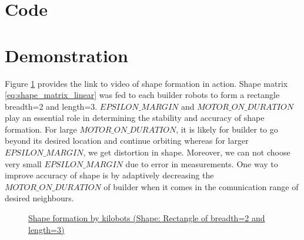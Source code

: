 \documentclass{report}[12pt]
\begin{document}
\section{Code}



\section{Demonstration}
Figure \ref{fig:shape_formation_demo} provides the link to video of shape formation in action. Shape matrix \eqref{eq:shape_matrix_linear} was fed to each builder robots to form a rectangle  breadth=2 and length=3. $EPSILON\_MARGIN$ and $MOTOR\_ON\_DURATION$ play an essential role in determining the stability and accuracy of shape formation. For large $MOTOR\_ON\_DURATION$, it is likely for builder to go beyond its desired location and continue orbiting whereas for larger $EPSILON\_MARGIN$, we get distortion in shape. Moreover, we can not choose very small $EPSILON\_MARGIN$ due to error in measurements. One way to improve accuracy of shape is by adaptively decreasing the $MOTOR\_ON\_DURATION$ of builder when it comes in the comunication range of desired neighbours.
\begin{figure}[H]
    \centering
    \caption{\href{https://youtu.be/SoDq9GQvNAE}{Shape formation by kilobots (Shape: Rectangle of breadth=2 and length=3)}}
    \label{fig:shape_formation_demo}
\end{figure}
\end{document}

